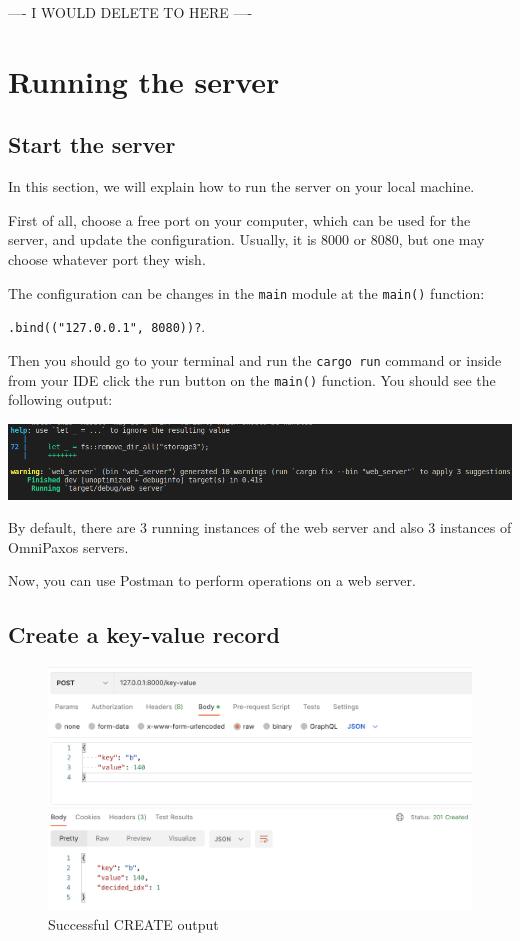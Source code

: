 \documentclass[a4paper, 11pt]{article}
\begin{document}
---- I WOULD DELETE TO HERE ----


\section{Running the server}
\subsection{Start the server}

In this section, we will explain how to run the server on your local machine.

First of all, choose a free port on your computer, which can be used for the server, and update the configuration. Usually, it is 8000 or 8080, but one may choose whatever port they wish.

The configuration can be changes in the \verb|main| module at the \verb|main()| function: 

\verb|.bind(("127.0.0.1", 8080))?|.

Then you should go to your terminal and run the \verb|cargo run| command or inside from your IDE click the run button on the \verb|main()| function. You should see the following output:

\includegraphics[width=\textwidth,keepaspectratio]{Run.png}

By default, there are 3 running instances of the web server and also 3 instances of OmniPaxos servers.

Now, you can use Postman to perform operations on a web server.

\subsection{Create a key-value record}

\begin{figure}[H]
\centering
\includegraphics[width=\textwidth,keepaspectratio]{create.png}
\caption{Successful CREATE output}
\end{figure}
\end{document}
